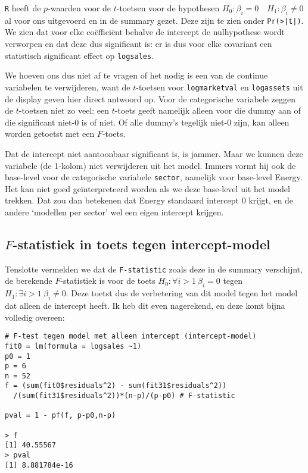 \documentclass[a4paper]{report}
\begin{document}
  \verb!R! heeft de $p$-waarden voor de $t$-toetsen voor de hypothesen $H_0:\beta_i = 0 \quad H_1:\beta_i \neq 0$ al voor ons uitgevoerd en in de summary gezet. Deze zijn te zien onder \verb!Pr(>|t|)!. We zien dat voor elke co\"effici\"ent behalve de intercept de nulhypothese wordt verworpen en dat deze dus significant is: er is dus voor elke covariaat een statistisch significant effect op \verb!logsales!.
  
  We hoeven ons dus niet af te vragen of het nodig is een van de continue variabelen te verwijderen, want de $t$-toetsen voor \verb!logmarketval! en \verb!logassets! uit de display geven hier direct antwoord op. Voor de categorische variabele zeggen de $t$-toetsen niet zo veel: een $t$-toets geeft namelijk alleen voor d\' ie dummy aan of die significant niet-0 is of niet. Of alle dummy's tegelijk niet-0 zijn, kan alleen worden getoetst met een $F$-toets.

  Dat de intercept niet aantoonbaar significant is, is jammer. Maar we kunnen deze variabele (de 1-kolom) niet verwijderen uit het model. Immers vormt hij ook de base-level voor de categorische variabele \verb!sector!, namelijk voor base-level Energy. Het kan niet goed ge\"interpreteerd worden als we deze base-level uit het model trekken. Dat zou dan betekenen dat Energy standaard intercept 0 krijgt, en de andere `modellen per sector' wel een eigen intercept krijgen.
  
\subsection{$F$-statistiek in toets tegen intercept-model}
  Tenslotte vermelden we dat de \verb!F-statistic! zoals deze in de summary verschijnt, de berekende $F$-statistiek is voor de toets $H_0: \forall i>1 \ \beta_i = 0$ tegen $H_1: \exists i>1 \ \beta_i \neq 0$. Deze toetst dus de verbetering van dit model tegen het model dat alleen de intercept heeft. Ik heb dit even nagerekend, en deze komt bijna volledig overeen:
  
\begin{verbatim}
# F-test tegen model met alleen intercept (intercept-model)
fit0 = lm(formula = logsales ~1)
p0 = 1
p = 6
n = 52
f = (sum(fit0$residuals^2) - sum(fit31$residuals^2))
  /(sum(fit31$residuals^2))*(n-p)/(p-p0) # F-statistic

pval = 1 - pf(f, p-p0,n-p)

> f 
[1] 40.55567
> pval
[1] 8.881784e-16
\end{verbatim}
  
\end{document}
